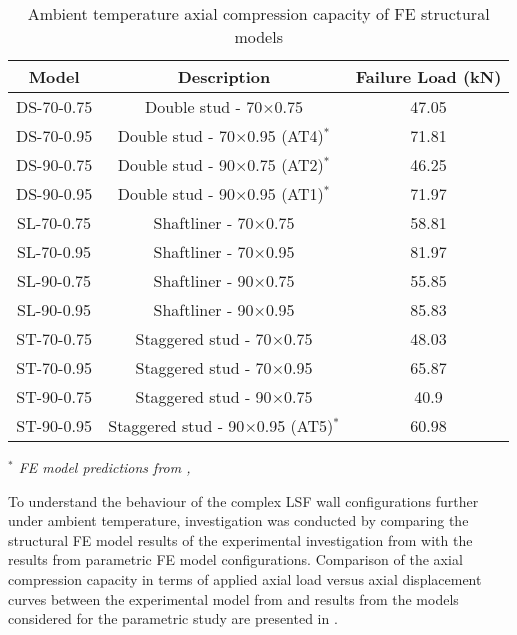 \begin{table}[!htbp]
	\centering
	\begin{threeparttable}
			\caption{Ambient temperature axial compression capacity of FE structural models}
				\begin{tabular}{ccc}
					\toprule
					Model & Description & Failure Load (kN) \\
					\midrule
					DS-70-0.75 & Double stud - 70$\times$0.75 & 47.05 \\
					DS-70-0.95 & Double stud - 70$\times$0.95 (AT4)$^*$ & 71.81 \\
					DS-90-0.75 & Double stud - 90$\times$0.75 (AT2)$^*$ & 46.25 \\
					DS-90-0.95 & Double stud - 90$\times$0.95 (AT1)$^*$ & 71.97 \\
					SL-70-0.75 & Shaftliner - 70$\times$0.75 & 58.81 \\
					SL-70-0.95 & Shaftliner - 70$\times$0.95 & 81.97 \\
					SL-90-0.75 & Shaftliner - 90$\times$0.75 & 55.85 \\
					SL-90-0.95 & Shaftliner - 90$\times$0.95 & 85.83 \\
					ST-70-0.75 & Staggered stud - 70$\times$0.75 & 48.03 \\
					ST-70-0.95 & Staggered stud - 70$\times$0.95 & 65.87 \\
					ST-90-0.75 & Staggered stud - 90$\times$0.75 & 40.9 \\
					ST-90-0.95 & Staggered stud - 90$\times$0.95 (AT5)$^*$ & 60.98 \\
					\bottomrule
				\end{tabular}%
					\label{tab:ambient-parametric}%
						\begin{tablenotes}
							\small
							\item \textit{\(^*\) FE model predictions from , }
						\end{tablenotes}
	\end{threeparttable}
\end{table}%

To understand the behaviour of the complex LSF wall configurations further under ambient temperature, investigation was conducted by comparing the structural FE model results of the experimental investigation from  with the results from parametric FE model configurations. Comparison of the axial compression capacity in terms of applied axial load versus axial displacement curves between the experimental model from  and results from the models considered for the parametric study are presented in .

